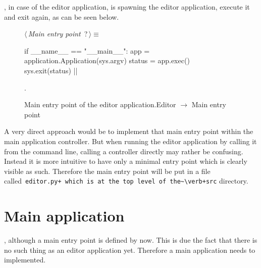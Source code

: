 \documentclass[%
    a4paper,    %
    justified,  %
    nobib,      %
    openany     %
]{tufte-book}
\makeatletter
\renewcommand{\label}[1]{\@tufte@label{##1}}%
\makeatother
\begin{document}
, in case of the editor
application, is spawning the editor application, execute it and exit again, as
can be seen below.

\begin{figure}[h]
  \begin{flushleft} \small
\begin{minipage}{\linewidth}\label{scrap11}\raggedright\small
{} $\langle\,${\itshape Main entry point}\nobreak\ {\footnotesize {?}}$\,\rangle\equiv$
\vspace{-1ex}
\begin{pythoncode}
if __name__ == "__main__":
    app = application.Application(sys.argv)
    status = app.exec()
    sys.exit(status)
  |\NWsep|
\end{pythoncode}
\vspace{1.5ex}
\footnotesize
\begin{list}{}{\setlength{\itemsep}{-\parsep}\setlength{\itemindent}{-\leftmargin}}
\item {\NWtxtMacroNoRef}.

\item{}
\end{list}
\end{minipage}\vspace{4ex}
\end{flushleft}
\caption{Main entry point of the editor application.\newline{}\newline{}Editor
    $\rightarrow$ Main entry point}
  \label{editor:lst:main}
\end{figure}

 A very direct approach
would be to implement that main entry point within the main application
controller. But when running the editor application by calling it from the
command line, calling a controller directly may rather be confusing. Instead it
is more intuitive to have only a minimal entry point which is clearly visible as
such. Therefore the main entry point will be put in a file
called~\verb=editor.py+ which is at the top level of the~\verb+src= directory.

\section{Main application}
\label{appendix:sec:editor:app}

, although a main entry
point is defined by now. This is due the fact that there is no such thing as an
editor application yet. Therefore a main application needs to implemented.
\end{document}
